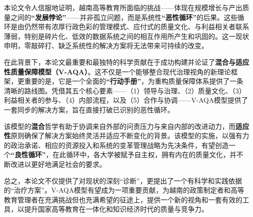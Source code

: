 本论文令人信服地证明，越南高等教育所面临的挑战——体现在规模增长与产出质量之间的\textbf{“发展悖论”}——并非孤立问题，而是系统性\textbf{“恶性循环”}的后果。这些循环是由仍然带有浓厚行政色彩的管理模式、应付式的质量文化、与利益相关者联系薄弱，特别是碎片化、低效的数据系统之间的相互作用所产生和巩固的。这一现状申明，零敲碎打、缺乏系统性的解决方案将无法带来可持续的改变。

在此背景下，本论文最重要和最独特的科学贡献在于成功构建并论证了\textbf{混合与适应性质量保障模型（V-AQA）}。这不仅是一个能够整合现代治理视角的新理论框架，更重要的是，它是一个全面的\textbf{“行动手册”}，为重构质量保障体系提供了一条清晰的路线图。凭借其五个核心要素——（1）领导与治理、（2）质量文化、（3）利益相关者的参与、（4）内部流程，以及（5）合作与协调——V-AQA模型提供了一套同步的解决方案，旨在直接打破已识别的恶性循环。

该模型的\textbf{混合}哲学有助于协调来自外部的问责压力与来自内部的改进动力，而\textbf{适应性}原则确保了解决方案始终灵活并适应不断变化的背景。该模型的实施，以强有力的政治承诺、相应的资源投入和系统的变革管理战略为先决条件，有望创造一个\textbf{“良性循环”}，在此循环中，各大学被赋予自主权，拥有内在的质量文化，并不断改进以更好地满足社会的要求。

总之，本论文不仅提供了对现状的深刻“诊断”，更提出了一个有科学和实践依据的“治疗方案”。V-AQA模型有望成为一项重要贡献，为越南的政策制定者和高等教育管理者在充满挑战但也充满希望的征途上，提供一个新的视角和一套有效的工具，以提升国家高等教育在一体化和知识经济时代的质量与竞争力。












